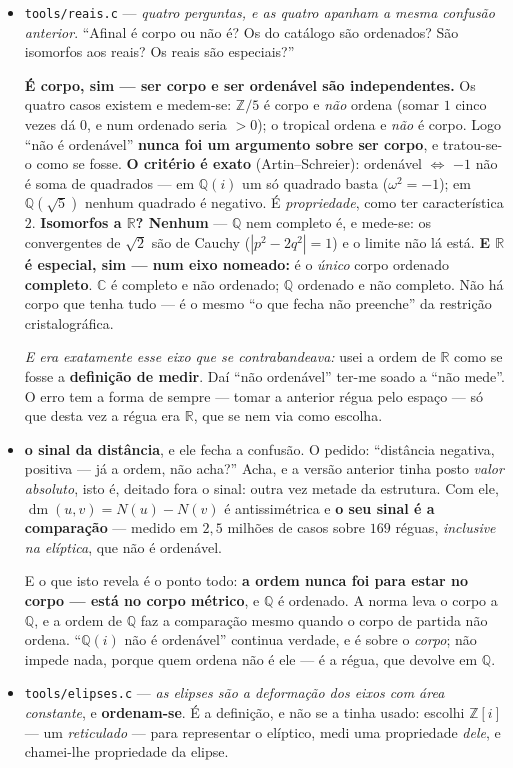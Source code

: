 \documentclass[11pt]{article}
\newcommand{\code}[1]{\texttt{\small #1}}
\newcommand{\Z}{\mathbb Z}
\newcommand{\R}{\mathbb R}
\newcommand{\Q}{\mathbb Q}
\newcommand{\C}{\mathbb C}
\theoremstyle{plain}
\theoremstyle{remark}
\newcommand{\dm}{\operatorname{dm}}
\begin{document}
\begin{itemize}
\emph{O que não se apaga}, e é diferente: \code{ordem.c} continua, porque o que ele mede é
\textbf{verdade} --- o elíptico não é ordenável, e o sinal no hiperbólico decide-se exato em $\Z$.
Um resultado verdadeiro não deixa de o ser por se ter tirado dele a conclusão errada. O que se
apagou foi a \emph{conclusão}, e o código que a executava.
\item \code{tools/reais.c} --- \emph{quatro perguntas, e as quatro apanham a mesma confusão
anterior}. ``Afinal é corpo ou não é? Os do catálogo são ordenados? São isomorfos aos reais? Os reais
são especiais?''

\textbf{É corpo, sim --- ser corpo e ser ordenável são independentes.} Os quatro casos existem e
medem-se: $\Z/5$ é corpo e \emph{não} ordena (somar $1$ cinco vezes dá $0$, e num ordenado seria
$>0$); o tropical ordena e \emph{não} é corpo. Logo ``não é ordenável'' \textbf{nunca foi um
argumento sobre ser corpo}, e tratou-se-o como se fosse. \textbf{O critério é exato}
(Artin--Schreier): ordenável $\iff$ $-1$ não é soma de quadrados --- em $\Q(i)$ um só quadrado
basta ($\omega^2 = -1$); em $\Q(\sqrt5)$ nenhum quadrado é negativo. É \emph{propriedade}, como ter
característica $2$. \textbf{Isomorfos a $\R$? Nenhum} --- $\Q$ nem completo é, e mede-se: os
convergentes de $\sqrt2$ são de Cauchy ($|p^2-2q^2| = 1$) e o limite não lá está. \textbf{E $\R$ é
especial, sim --- num eixo nomeado:} é o \emph{único} corpo ordenado \textbf{completo}. $\C$ é
completo e não ordenado; $\Q$ ordenado e não completo. Não há corpo que tenha tudo --- é o mesmo
``o que fecha não preenche'' da restrição cristalográfica.

\emph{E era exatamente esse eixo que se contrabandeava:} usei a ordem de $\R$ como se fosse a
\textbf{definição de medir}. Daí ``não ordenável'' ter-me soado a ``não mede''. O erro tem a forma
de sempre --- tomar a anterior régua pelo espaço --- só que desta vez a régua era $\R$, que se nem via
como escolha.

\item \textbf{o sinal da distância}, e ele fecha a confusão. O pedido: ``distância negativa,
positiva --- já a ordem, não acha?'' Acha, e a versão anterior tinha posto \emph{valor absoluto}, isto é, deitado
fora o sinal: outra vez metade da estrutura. Com ele, $\dm(u,v) = N(u)-N(v)$ é antissimétrica e
\textbf{o seu sinal é a comparação} --- medido em $2{,}5$ milhões de casos sobre $169$ réguas,
\emph{inclusive na elíptica}, que não é ordenável.

E o que isto revela é o ponto todo: \textbf{a ordem nunca foi para estar no corpo --- está no corpo
métrico}, e $\Q$ é ordenado. A norma leva o corpo a $\Q$, e a ordem de $\Q$ faz a comparação mesmo
quando o corpo de partida não ordena. ``$\Q(i)$ não é ordenável'' continua verdade, e é sobre o
\emph{corpo}; não impede nada, porque quem ordena não é ele --- é a régua, que devolve em $\Q$.
\item \code{tools/elipses.c} --- \emph{as elipses são a deformação dos eixos com área
constante}, e \textbf{ordenam-se}. É a definição, e não se a tinha usado: escolhi $\Z[i]$ --- um
\emph{reticulado} --- para representar o elíptico, medi uma propriedade \emph{dele}, e chamei-lhe
propriedade da elipse.


\end{itemize}
\end{document}
